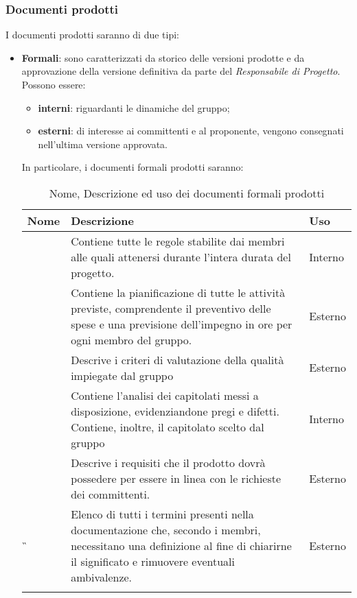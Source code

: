 \subsubsection{Documenti prodotti \hfil}

I documenti prodotti saranno di due tipi:
\begin{itemize}
	\item \textbf{Formali}: sono caratterizzati da storico delle versioni prodotte e da approvazione della versione definitiva da parte del \textit{Responsabile di Progetto}. Possono essere:
	\begin{itemize}
		\item \textbf{interni}: riguardanti le dinamiche del gruppo;
		\item \textbf{esterni}: di interesse ai committenti e al proponente, vengono consegnati nell'ultima versione approvata.
	\end{itemize} 
In particolare, i documenti formali prodotti saranno:
\newpage
{
	\setlength{\freewidth}{\dimexpr\textwidth-1\tabcolsep}
	\renewcommand{\arraystretch}{1.5}
	\setlength{\aboverulesep}{0pt}
	\setlength{\belowrulesep}{0pt}
	\begin{longtable}{L{.210\freewidth} L{.6\freewidth} L{.080\freewidth}}
		\toprule 
		\textbf{Nome} & \textbf{Descrizione} & \textbf{Uso}\\
		\toprule
		\endhead		
		\NdP{} & Contiene tutte le regole stabilite dai membri alle quali attenersi durante l'intera durata del progetto. & Interno \\ 
		\PdP{} & Contiene la pianificazione di tutte le attività previste, comprendente il preventivo delle spese e una previsione dell'impegno in ore per ogni membro del gruppo. & Esterno \\
		\PdQ{} & Descrive i criteri di valutazione della qualità impiegate dal gruppo & Esterno \\ 
		\SdF{} & Contiene l'analisi dei capitolati messi a disposizione, evidenziandone pregi e difetti. Contiene, inoltre, il capitolato scelto dal gruppo & Interno \\
		\AdR{} & Descrive i requisiti che il prodotto dovrà possedere per essere in linea con le richieste dei committenti. & Esterno \\ 	
		\G{} & Elenco di tutti i termini presenti nella documentazione che, secondo i membri, necessitano una definizione al fine di chiarirne il significato e rimuovere eventuali ambivalenze. & Esterno \\  			
		\bottomrule
		\hiderowcolors
		\caption{Nome, Descrizione ed uso dei documenti formali prodotti}
	\end{longtable}
}


\end{itemize}
